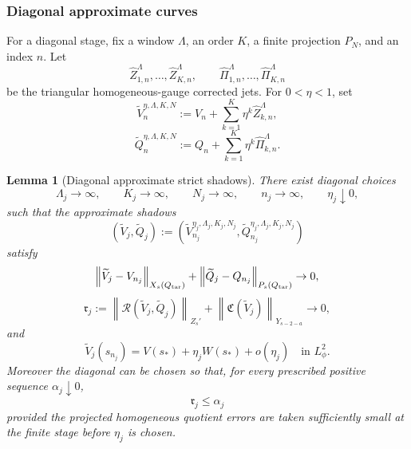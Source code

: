 \documentclass[11pt]{article}
\numberwithin{equation}{section}
\theoremstyle{plain}
\newtheorem{lemma}{Lemma}[section]
\theoremstyle{definition}
\theoremstyle{remark}
\newcommand{\norm}[2]{\left\|#1\right\|_{#2}}
\newcommand{\calC}{\mathfrak C}
\newcommand{\calR}{\mathcal R}
\begin{document}
\subsubsection{Diagonal approximate curves}

For a diagonal stage, fix a window \(\Lambda\), an order \(K\), a finite projection
\(P_N\), and an index \(n\).  Let
\[
        \widehat Z^\Lambda_{1,n},\ldots,
        \widehat Z^\Lambda_{K,n},
        \qquad
        \widehat\Pi^\Lambda_{1,n},\ldots,
        \widehat\Pi^\Lambda_{K,n}
\]
be the triangular homogeneous-gauge corrected jets.  For \(0<\eta<1\), set
\begin{equation}\label{pIV:eq:diagonal-approx-V}
        \widetilde V^{\eta,\Lambda,K,N}_n
        :=V_n+
        \sum_{k=1}^K \eta^k\widehat Z^\Lambda_{k,n},
\end{equation}
\begin{equation}\label{pIV:eq:diagonal-approx-Q}
        \widetilde Q^{\eta,\Lambda,K,N}_n
        :=Q_n+
        \sum_{k=1}^K \eta^k\widehat\Pi^\Lambda_{k,n}.
\end{equation}

\begin{lemma}[Diagonal approximate strict shadows]
\label{pIV:lem:diagonal-approx-shadows}
There exist diagonal choices
\[
        \Lambda_j\to\infty,
        \qquad
        K_j\to\infty,
        \qquad
        N_j\to\infty,
        \qquad
        n_j\to\infty,
        \qquad
        \eta_j\downarrow0,
\]
such that the approximate shadows
\[
        (\widetilde V_j,\widetilde Q_j)
        :=
        (\widetilde V^{\eta_j,\Lambda_j,K_j,N_j}_{n_j},
        \widetilde Q^{\eta_j,\Lambda_j,K_j,N_j}_{n_j})
\]
satisfy
\begin{equation}\label{pIV:eq:diag-small-perturb}
        \norm{\widetilde V_j-V_{n_j}}{X_s(Q_{\rm tar})}
        +
        \norm{\widetilde Q_j-Q_{n_j}}{P_s(Q_{\rm tar})}
        \to0,
\end{equation}
\begin{equation}\label{pIV:eq:diag-residuals-vanish}
        \mathfrak r_j
        :=
        \norm{\calR(\widetilde V_j,\widetilde Q_j)}{Z_s'}
        +
        \norm{\calC(\widetilde V_j)}{Y_{s-2-a}}
        \to0,
\end{equation}
and
\begin{equation}\label{pIV:eq:diag-trace-normalization}
        \widetilde V_j(s_{n_j})
        =
        V(s_*)+
        \eta_j W(s_*)+
        o(\eta_j)
        \quad\text{in }L^2_\phi.
\end{equation}
Moreover the diagonal can be chosen so that, for every prescribed positive sequence
\(\alpha_j\downarrow0\),
\begin{equation}\label{pIV:eq:diag-prescribed-residual}
        \mathfrak r_j\le \alpha_j
\end{equation}
provided the projected homogeneous quotient errors are taken sufficiently small at the
finite stage before \(\eta_j\) is chosen.
\end{lemma}
\end{document}
